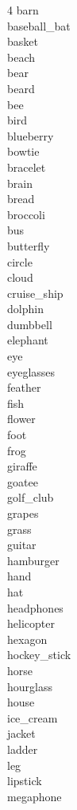 \documentclass[sigconf]{acmart}
\begin{document}
\begin{multicols}{4}
\noindent
barn\\
baseball\_bat\\
basket\\
beach\\
bear\\
beard\\
bee\\
bird\\
blueberry\\
bowtie\\
bracelet\\
brain\\
bread\\
broccoli\\
bus\\
butterfly\\
circle\\
cloud\\
cruise\_ship\\
dolphin\\
dumbbell\\
elephant\\
eye\\
eyeglasses\\
feather\\
fish\\
flower\\
foot\\
frog\\
giraffe\\
goatee\\
golf\_club\\
grapes\\
grass\\
guitar\\
hamburger\\
hand\\
hat\\
headphones\\
helicopter\\
hexagon\\
hockey\_stick\\
horse\\
hourglass\\
house\\
ice\_cream\\
jacket\\
ladder\\
leg\\
lipstick\\
megaphone\\

\end{multicols}
\end{document}
